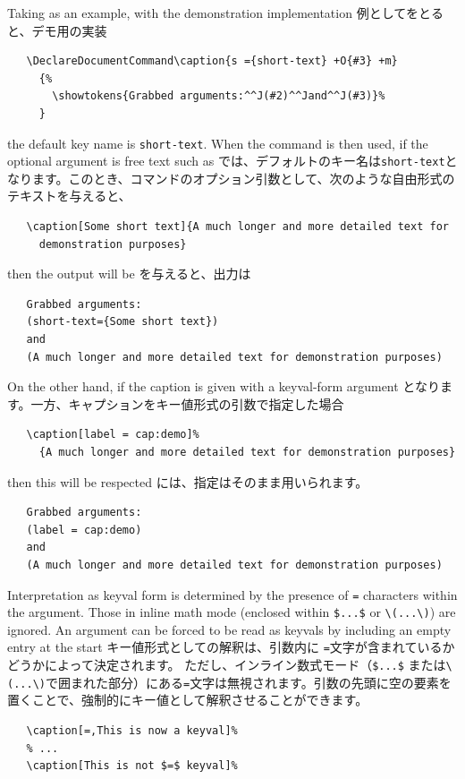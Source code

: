 \documentclass{ltxguide}
\newcommand\jpnewline{\vspace{3pt}\newline}
\begin{document}
Taking  as an example, with the demonstration implementation
\jpnewline
例としてをとると、デモ用の実装
\begin{verbatim}
   \DeclareDocumentCommand\caption{s ={short-text} +O{#3} +m}
     {%
       \showtokens{Grabbed arguments:^^J(#2)^^Jand^^J(#3)}%
     }
\end{verbatim}
the default key name is \texttt{short-text}. When the command  is
then used, if the optional argument is free text such as
\jpnewline
では、デフォルトのキー名は\texttt{short-text}となります。このとき、コマンドのオプション引数として、次のような自由形式のテキストを与えると、
\begin{verbatim}
   \caption[Some short text]{A much longer and more detailed text for
     demonstration purposes}
\end{verbatim}
then the output will be
\jpnewline
を与えると、出力は
\begin{verbatim}
   Grabbed arguments:
   (short-text={Some short text})
   and
   (A much longer and more detailed text for demonstration purposes)
\end{verbatim}
On the other hand, if the caption is given with a keyval-form argument
\jpnewline
となります。一方、キャプションをキー値形式の引数で指定した場合
\begin{verbatim}
   \caption[label = cap:demo]%
     {A much longer and more detailed text for demonstration purposes}
\end{verbatim}
then this will be respected
\jpnewline
には、指定はそのまま用いられます。
\begin{verbatim}
   Grabbed arguments:
   (label = cap:demo)
   and
   (A much longer and more detailed text for demonstration purposes)
\end{verbatim}

Interpretation as keyval form is determined by the presence of \texttt{=}
characters within the argument. Those in inline math mode (enclosed within
\verb|$...$| or \verb|\(...\)|) are ignored. An argument can be forced to be
read as keyvals by including an empty entry at the start
\jpnewline
キー値形式としての解釈は、引数内に \texttt{=}文字が含まれているかどうかによって決定されます。 ただし、インライン数式モード（\verb|$...$| または\verb|\(...\)|で囲まれた部分）にある\texttt{=}文字は無視されます。引数の先頭に空の要素を置くことで、強制的にキー値として解釈させることができます。
\begin{verbatim}
   \caption[=,This is now a keyval]%
   % ...
   \caption[This is not $=$ keyval]%
\end{verbatim}
\end{document}
